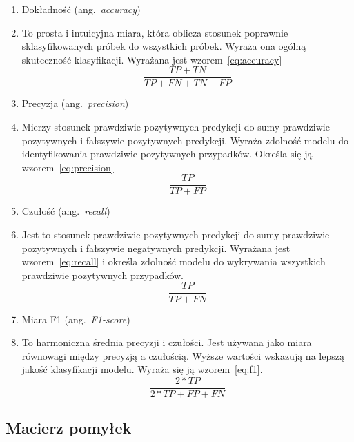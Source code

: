 \begin{enumerate}[label={\alph*)}]
	\item Dokładność (ang.~\emph{accuracy})
    \item [] To prosta i intuicyjna miara, która oblicza stosunek poprawnie sklasyfikowanych próbek do wszystkich próbek.
    Wyraża ona ogólną skuteczność klasyfikacji.
    Wyrażana jest wzorem~\ref{eq:accuracy}
    \begin{equation}
        \frac{TP + TN}{TP + FN + TN + FP}\label{eq:accuracy}
    \end{equation}
    \item Precyzja (ang.~\emph{precision})
    \item [] Mierzy stosunek prawdziwie pozytywnych predykcji do sumy prawdziwie pozytywnych i  fałszywie pozytywnych predykcji.
Wyraża zdolność modelu do identyfikowania prawdziwie pozytywnych przypadków.
Określa się ją wzorem~\ref{eq:precision}
      \begin{equation}
        \frac{TP}{TP + FP}\label{eq:precision}
    \end{equation}
    \item Czułość (ang.~\emph{recall})
    \item [] Jest to stosunek prawdziwie pozytywnych predykcji do sumy prawdziwie pozytywnych i fałszywie negatywnych predykcji.
Wyrażana jest wzorem~\ref{eq:recall} i określa zdolność modelu do wykrywania wszystkich prawdziwie pozytywnych przypadków.
    \begin{equation}
        \frac{TP}{TP + FN}\label{eq:recall}
    \end{equation}
    \item Miara F1 (ang.~\emph{F1-score})
    \item [] To harmoniczna średnia precyzji i czułości.
Jest używana jako miara równowagi między precyzją a czułością.
Wyższe wartości wskazują na lepszą jakość klasyfikacji modelu.
Wyraża się ją wzorem~\ref{eq:f1}.
  \begin{equation}
        \frac{2 * TP}{2 * TP + FP + FN}\label{eq:f1}
    \end{equation}
\end{enumerate}


\subsection{Macierz pomyłek}
\label{subsec:macierz-pomylek}

